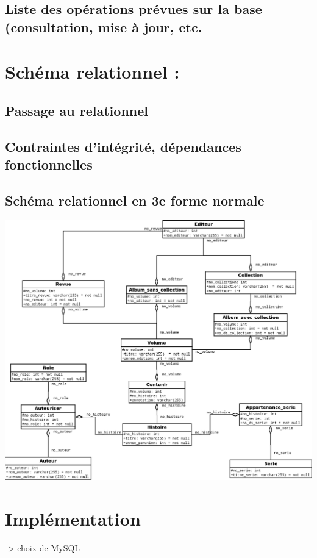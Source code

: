 \documentclass[12pt]{report}
\begin{document}
\subsection{Liste des opérations prévues sur la base (consultation, mise à
jour, etc.}

\section{Schéma relationnel :}

\subsection{Passage au relationnel}

\subsection{Contraintes d'intégrité, dépendances fonctionnelles}

\subsection{Schéma relationnel en 3e forme normale}

\noindent\includegraphics[width=\textwidth]{schema-relation}

\section{Implémentation }
-> choix de MySQL
\end{document}
